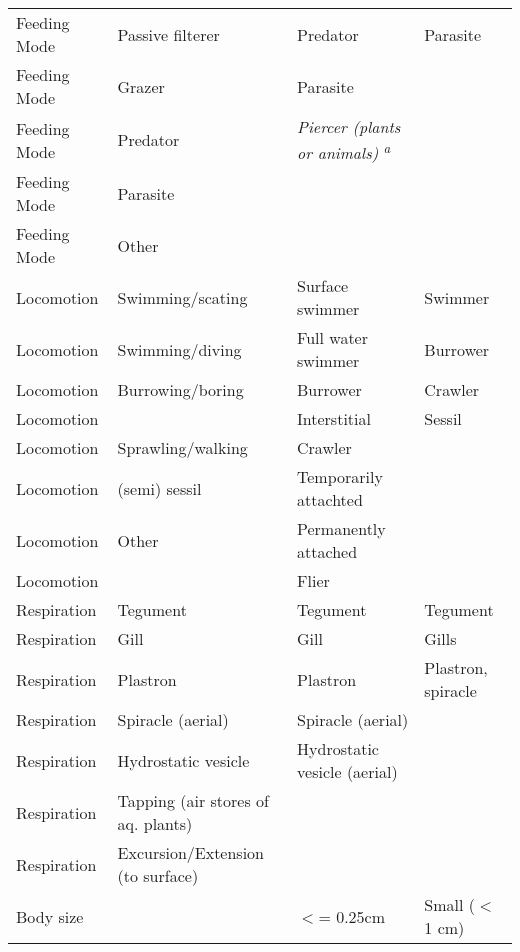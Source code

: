 \documentclass[../Draft_harmonization_paper.tex]{subfiles}
\begin{document}
\begin{longtable}{lll|l}
    \cellcolor{blue!50}Feeding Mode & \cellcolor{blue!50}Passive filterer & Predator & Parasite \\ 
    Feeding Mode & Grazer & Parasite &  \\ 
    Feeding Mode & Predator & \textit{Piercer (plants or animals)} \textsuperscript{\textit{a}} &  \\ 
    Feeding Mode & Parasite &  &  \\ 
    \color{cyan}Feeding Mode & \color{cyan}Other &  &  \\ 
    \hline
    \rowcolor{green!15}
    Locomotion & Swimming/scating & Surface swimmer & Swimmer \\ 
    \cellcolor{green!15}Locomotion & \cellcolor{green!15}Swimming/diving & \cellcolor{green!15}Full water swimmer & \cellcolor{green!50}Burrower \\ 
    \cellcolor{green!50}Locomotion & \cellcolor{green!50}Burrowing/boring & \cellcolor{green!50}Burrower & Crawler \\
    Locomotion &  & \cellcolor{green!50}Interstitial & \cellcolor{green!95}Sessil \\
    Locomotion & Sprawling/walking & Crawler &  \\ 
    \cellcolor{green!95}Locomotion & \cellcolor{green!95}(semi) sessil & \cellcolor{green!95}Temporarily attachted &  \\ 
    \color{cyan}Locomotion & \color{cyan}Other & \cellcolor{green!95}Permanently attached &  \\ 
    \color{cyan}Locomotion &  & \color{cyan}Flier &  \\
    \hline
    Respiration & Tegument & Tegument & Tegument \\ 
    Respiration & Gill & Gill & Gills \\ 
    \rowcolor{orange!25}
    Respiration & Plastron & Plastron & Plastron, spiracle \\ 
    \cellcolor{orange!25}Respiration & \cellcolor{orange!25}Spiracle (aerial) & \cellcolor{orange!25}Spiracle (aerial) &  \\ 
    \color{cyan}Respiration & \color{cyan}Hydrostatic vesicle & \color{cyan}Hydrostatic vesicle (aerial) &  \\ 
    \color{cyan}Respiration & \color{cyan}Tapping (air stores of aq. plants) &  &  \\ 
    \color{cyan}Respiration & \color{cyan}Excursion/Extension (to surface) &  &  \\ 
    \hline
    Body size &  & $<$= 0.25cm & Small ($<$ 1 cm) \\ 

\end{longtable}
\end{document}
